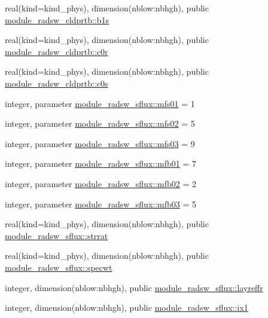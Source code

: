 \begin{DoxyCompactItemize}
\item 
real(kind=kind\+\_\+phys), dimension(nblow\+:nbhgh), public \hyperlink{group__module__radsw__main_ga2d2296e76fb85b66bd4583bcb9fa271b}{module\+\_\+radsw\+\_\+cldprtb\+::b1s}
\item 
real(kind=kind\+\_\+phys), dimension(nblow\+:nbhgh), public \hyperlink{group__module__radsw__main_ga8927b6e7cc810301e3843eb0f5c0c795}{module\+\_\+radsw\+\_\+cldprtb\+::c0r}
\item 
real(kind=kind\+\_\+phys), dimension(nblow\+:nbhgh), public \hyperlink{group__module__radsw__main_gaab7693c5f31ce2182bca61aff77996bc}{module\+\_\+radsw\+\_\+cldprtb\+::c0s}
\item 
integer, parameter \hyperlink{namespacemodule__radsw__sflux_aba08e6f9d4dccd130e87300e6fd0ed58}{module\+\_\+radsw\+\_\+sflux\+::mfs01} = 1
\item 
integer, parameter \hyperlink{group__module__radsw__main_gacca3bbc0dd125a3e8c3734c58c48e79b}{module\+\_\+radsw\+\_\+sflux\+::mfs02} = 5
\item 
integer, parameter \hyperlink{group__module__radsw__main_ga5bd55a5106ce82bd47250d38d9b8f22a}{module\+\_\+radsw\+\_\+sflux\+::mfs03} = 9
\item 
integer, parameter \hyperlink{group__module__radsw__main_ga08a0f1278962ac27634169ea7632bc70}{module\+\_\+radsw\+\_\+sflux\+::mfb01} = 7
\item 
integer, parameter \hyperlink{group__module__radsw__main_gafdf71cabed6ae0076d98ff0e563dbc61}{module\+\_\+radsw\+\_\+sflux\+::mfb02} = 2
\item 
integer, parameter \hyperlink{group__module__radsw__main_ga2e3b510d781c596fa0bb9b1359a988dd}{module\+\_\+radsw\+\_\+sflux\+::mfb03} = 5
\item 
real(kind=kind\+\_\+phys), dimension(nblow\+:nbhgh), public \hyperlink{group__module__radsw__main_gaee2a2275da028b0960c5c1c8a34f46cf}{module\+\_\+radsw\+\_\+sflux\+::strrat}
\item 
real(kind=kind\+\_\+phys), dimension(nblow\+:nbhgh), public \hyperlink{group__module__radsw__main_ga7d1a386e92555bcb09239ab098d8b398}{module\+\_\+radsw\+\_\+sflux\+::specwt}
\item 
integer, dimension(nblow\+:nbhgh), public \hyperlink{group__module__radsw__main_ga90c56da1bcadbea0b42e12487c1c1eec}{module\+\_\+radsw\+\_\+sflux\+::layreffr}
\item 
integer, dimension(nblow\+:nbhgh), public \hyperlink{group__module__radsw__main_gac2864b4501e9bc3804d45d14f4aab472}{module\+\_\+radsw\+\_\+sflux\+::ix1}

\end{DoxyCompactItemize}
